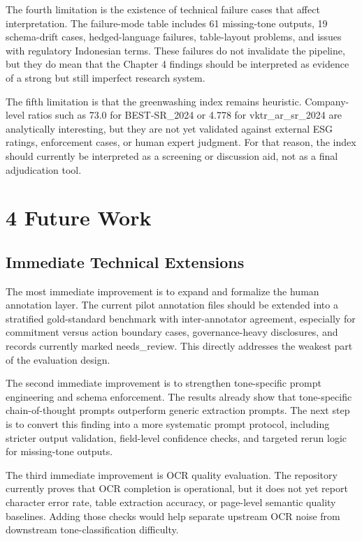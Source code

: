 The fourth limitation is the existence of technical failure cases that affect interpretation. The failure-mode table includes 61 missing-tone outputs, 19 schema-drift cases, hedged-language failures, table-layout problems, and issues with regulatory Indonesian terms. These failures do not invalidate the pipeline, but they do mean that the Chapter 4 findings should be interpreted as evidence of a strong but still imperfect research system.

The fifth limitation is that the greenwashing index remains heuristic. Company-level ratios such as 73.0 for BEST-SR\_2024 or 4.778 for vktr\_ar\_sr\_2024 are analytically interesting, but they are not yet validated against external ESG ratings, enforcement cases, or human expert judgment. For that reason, the index should currently be interpreted as a screening or discussion aid, not as a final adjudication tool.
\section{4 Future Work}
\subsection{Immediate Technical Extensions}

The most immediate improvement is to expand and formalize the human annotation layer. The current pilot annotation files should be extended into a stratified gold-standard benchmark with inter-annotator agreement, especially for commitment versus action boundary cases, governance-heavy disclosures, and records currently marked needs\_review. This directly addresses the weakest part of the evaluation design.

The second immediate improvement is to strengthen tone-specific prompt engineering and schema enforcement. The results already show that tone-specific chain-of-thought prompts outperform generic extraction prompts. The next step is to convert this finding into a more systematic prompt protocol, including stricter output validation, field-level confidence checks, and targeted rerun logic for missing-tone outputs.

The third immediate improvement is OCR quality evaluation. The repository currently proves that OCR completion is operational, but it does not yet report character error rate, table extraction accuracy, or page-level semantic quality baselines. Adding those checks would help separate upstream OCR noise from downstream tone-classification difficulty.

